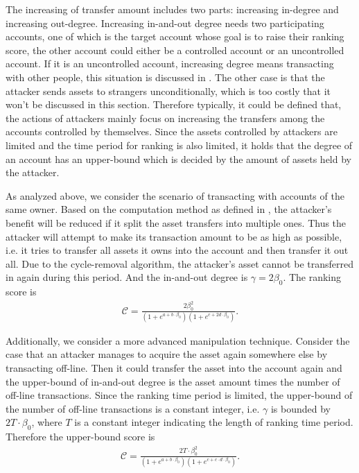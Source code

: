 The increasing of transfer amount includes two parts: increasing in-degree and increasing out-degree. Increasing in-and-out degree needs two participating accounts, one of which is the target account whose goal is to raise their ranking score, the other account could either be a controlled account or an uncontrolled account. If it is an uncontrolled account, increasing degree means transacting with other people, this situation is discussed in . The other case is that the attacker sends assets to strangers unconditionally, which is too costly that it won't be discussed in this section. Therefore typically, it could be defined that, the actions of attackers mainly focus on increasing the transfers among the accounts controlled by themselves. Since the assets controlled by attackers are limited and the time period for ranking is also limited, it holds that the degree of an account has an upper-bound which is decided by the amount of assets held by the attacker.

As analyzed above, we consider the scenario of transacting with accounts of the
same owner. Based on the computation method  as defined in , the attacker's benefit will be reduced if it split the asset transfers into multiple ones. Thus the attacker will attempt to make its transaction amount to be as high as possible, i.e. it tries to transfer all assets it owns into the account and then transfer it out all. Due to the cycle-removal algorithm, the attacker's asset cannot be transferred in again during this period. And the in-and-out degree is $\gamma = 2 \beta_0$. The ranking score is
\begin{align}
\mathcal{C} =  \frac{2 \beta_0 ^2}{ (1+e^{a + b \cdot \beta_0}) (1+e^{c + 2 d
  \cdot \beta_0})}.
\end{align}

Additionally, we consider a more advanced manipulation technique. Consider the case that an attacker manages to acquire the asset again somewhere else by transacting off-line. Then it could transfer the asset into the account again and the upper-bound of in-and-out degree is the asset amount times the number of off-line transactions. Since the ranking time period is limited, the upper-bound of the number of off-line transactions is a constant integer, i.e. $\gamma$ is bounded by $2T \cdot \beta_0$, where $T$ is a constant integer indicating the length of ranking time period. Therefore the upper-bound score is
\begin{align}
  \mathcal{C} =  \frac{2T \cdot \beta_0 ^2}{ (1+e^{a + b \cdot \beta_0})
  (1+e^{c + c \cdot d \cdot \beta_0})}.
\end{align}

